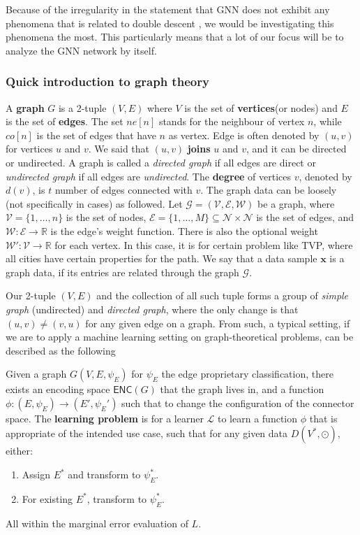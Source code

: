 Because of the irregularity in the statement that GNN does not exhibit any phenomena that is related to double descent \cite{shi2024homophilymodulatesdoubledescent}, we would be investigating this phenomena the most. This particularly means that a lot of our focus will be to analyze the GNN network by itself. 

\subsubsection{Quick introduction to graph theory}

A \textbf{graph} $G$ is a 2-tuple $(V,E)$ where $V$ is the set of \textbf{vertices}(or nodes) and $E$ is the set of \textbf{edges}. The set $ne[n]$ stands for the neighbour of vertex $n$, while $co[n]$ is the set of edges that have $n$ as vertex. Edge is often denoted by $(u,v)$ for vertices $u$ and $v$. We said that $(u,v)$ \textbf{joins} $u$ and $v$, and it can be directed or undirected. A graph is called a \textit{directed graph} if all edges are direct or \textit{undirected graph} if all edges are \textit{undirected}. The \textbf{degree} of vertices $v$, denoted by $d(v)$, is $t$ number of edges connected with $v$.
The graph data can be loosely (not specifically in cases) as followed. Let $\mathcal{G}=(\mathcal{V},\mathcal{E},\mathcal{W})$ be a graph, where $\mathcal{V}=\{1,\dots,n\}$ is the set of nodes, $\mathcal{E}=\{1,\dots,M\}\subseteq \mathcal{N}\times \mathcal{N}$ is the set of edges, and $\mathcal{W}: \mathcal{E}\to \mathbb{R}$ is the edge's weight function. There is also the optional weight $\mathcal{W}': \mathcal{V}\to \mathbb{R}$ for each vertex. In this case, it is for certain problem like TVP, where all cities have certain properties for the path. We say that a data sample $\mathbf{x}$ is a graph data, if its entries are related through the graph $\mathcal{G}$. 

Our 2-tuple $(V,E)$ and the collection of all such tuple forms a group of \textit{simple graph} (undirected) and \textit{directed graph}, where the only change is that $(u,v)\neq (v,u)$ for any given edge on a graph. From such, a typical setting, if we are to apply a machine learning setting on graph-theoretical problems, can be described as the following

\begin{definition}
    Given a graph $G(V,E,\psi_{E})$ for $\psi_{E}$ the edge proprietary classification, there exists an encoding space $\mathsf{ENC}(G)$ that the graph lives in, and a function $\phi: (E,\psi_{E})\to (E',\psi_{E}')$ such that to change the configuration of the connector space. The \textbf{learning problem} is for a learner $\mathcal{L}$ to learn a function $\phi$ that is appropriate of the intended use case, such that for any given data $D(V^{*},\odot)$, either:
    \begin{enumerate}
        \item Assign $E^{*}$ and transform to $\psi_{E}^{*}$. 
        \item For existing $E^{*}$, transform to $\psi^{*}_{E}$. 
    \end{enumerate}
    All within the marginal error evaluation of $L$. 
\end{definition}

